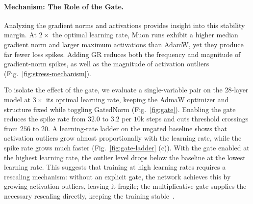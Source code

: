 \paragraph{Mechanism: The Role of the Gate.}
\label{sec:stability-mechanism}
Analyzing the gradient norms and activations provides insight into this stability margin. 
At $2\times$ the optimal learning rate, Muon runs exhibit a higher median gradient norm and larger maximum activations than AdamW, yet they produce far fewer loss spikes. 
Adding GR reduces both the frequency and magnitude of gradient-norm spikes, as well as the magnitude of activation outliers (Fig.~\ref{fig:stress-mechanism}). 


To isolate the effect of the gate, we evaluate a single-variable pair on the 28-layer model at $3\times$ its optimal learning rate, keeping the AdmaW optimizer and structure fixed while toggling GatedNorm (Fig.~\ref{fig:gate}). 
Enabling the gate reduces the spike rate from $32.0$ to $3.2$ per $10$k steps and cuts threshold crossings from $256$ to $20$. 
A learning-rate ladder on the ungated baseline shows that activation outliers grow almost proportionally with the learning rate, while the spike rate grows much faster (Fig.~\ref{fig:gate-ladder} (c)). 
With the gate enabled at the highest learning rate, the outlier level drops below the baseline at the lowest learning rate. 
This suggests that training at high learning rates requires a rescaling mechanism: without an explicit gate, the network achieves this by growing activation outliers, leaving it fragile; the multiplicative gate supplies the necessary rescaling directly, keeping the training  stable~\citep{qiu2025gated,qiu2026unified}.





